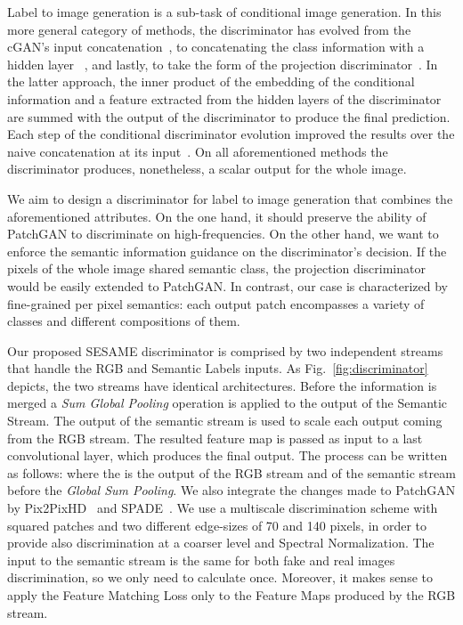\documentclass[runningheads]{llncs}
\newcommand{\fref}[1]{Fig.~\ref{#1}}
\begin{document}
Label to image generation is a sub-task of conditional image generation. In this more general category of methods, the discriminator has evolved from the cGAN's input concatenation~\cite{mirza2014conditional}, to concatenating the class information with a hidden layer ~\cite{reed2016generative}, and lastly, to take the form of the projection discriminator~\cite{miyato2018cgans}. In the latter approach, the inner product of the embedding of the conditional information and a feature extracted from the hidden layers of the discriminator are summed with the output of the discriminator to produce the final prediction. Each step of the conditional discriminator evolution improved the results over the naive concatenation at its input~\cite{miyato2018cgans}. On all aforementioned methods the discriminator produces, nonetheless, a scalar output for the whole image.

We aim to design a discriminator for label to image generation that combines the aforementioned attributes. On the one hand, it should preserve the ability of PatchGAN to discriminate on high-frequencies. On the other hand, we want to enforce the semantic information guidance on the discriminator's decision. If the pixels of the whole image shared semantic class, the projection discriminator would be easily extended to PatchGAN. In contrast, our case is characterized by fine-grained per pixel semantics: each output patch encompasses a variety of classes and different compositions of them.

Our proposed SESAME discriminator is comprised by two independent streams that handle the RGB and Semantic Labels inputs.
As \fref{fig:discriminator} depicts, the two streams have identical architectures. 
Before the information is merged a \textit{Sum Global Pooling} operation is applied to the output of the Semantic Stream.
The output of the semantic stream is used to scale each output coming from the RGB stream.
The resulted feature map is passed as input to a last  convolutional layer, which produces the final output.
The process can be written as follows:
\label{eq:scale}
where the  is the output of the RGB stream and  of the semantic stream before the \textit{Global Sum Pooling}.
We also integrate the changes made to PatchGAN by Pix2PixHD~\cite{wang2018pix2pixHD} and SPADE~\cite{park2019SPADE}.
We use a multiscale discrimination scheme with squared patches and two different edge-sizes of 70 and 140 pixels, in order to provide also discrimination at a coarser level and Spectral Normalization. 
The input to the semantic stream is the same for both fake and real images discrimination, so we only need to calculate  once. 
Moreover, it makes sense to apply the Feature Matching Loss only to the Feature Maps produced by the RGB stream.
\end{document}
